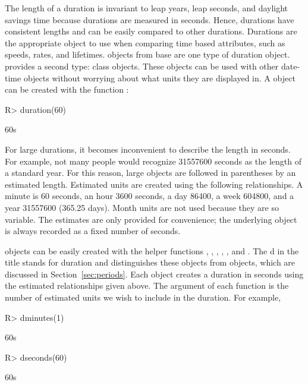 \documentclass[article]{jss}
\begin{document}
The length of a duration is invariant to leap years, leap seconds, and daylight savings time because durations are measured in seconds. Hence, durations have consistent lengths and can be easily compared to other durations. Durations are the appropriate object to use when comparing time based attributes, such as speeds, rates, and lifetimes.  objects from base  are one type of duration object.  provides a second type:  class objects. These objects can be used with other date-time objects without worrying about what units they are displayed in. A  object can be created with the function :

\begin{CodeInput}
R> duration(60)
\end{CodeInput}
\begin{CodeOutput}
[1] 60s
\end{CodeOutput}

For large durations, it becomes inconvenient to describe the length in seconds. For example, not many people would recognize 31557600 seconds as the length of a standard year. For this reason, large  objects are followed in parentheses by an estimated length. Estimated units are created using the following relationships. A minute is 60 seconds, an hour 3600 seconds, a day 86400, a week 604800, and a year 31557600 (365.25 days). Month units are not used because they are so variable. The estimates are only provided for convenience; the underlying object is always recorded as a fixed number of seconds.

 objects can be easily created with the helper functions
, , , , , and  . The d in the title stands for duration and distinguishes these objects from  objects, which are discussed in Section~\ref{sec:periods}. Each object creates a duration in seconds using the estimated relationships given above. The argument of each function is the number of estimated units we wish to include in the duration. For example,

\begin{CodeInput}
R> dminutes(1)
\end{CodeInput}
\begin{CodeOutput}
[1] 60s
\end{CodeOutput}

\begin{CodeInput}
R> dseconds(60)
\end{CodeInput}
\begin{CodeOutput}
[1] 60s
\end{CodeOutput}
\end{document}
